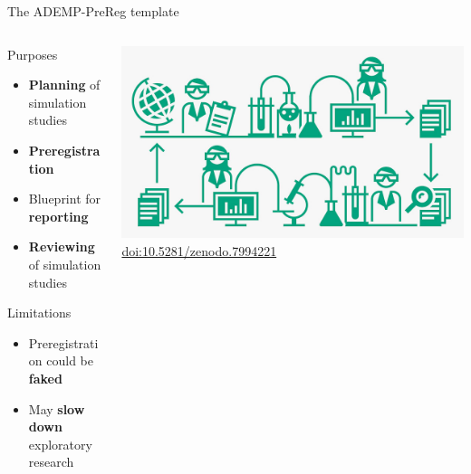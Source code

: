 \documentclass[english, 12pt, aspectratio=169]{beamer}
\begin{document}
\begin{frame}{The ADEMP-PreReg template}
  \begin{columns}
    \begin{column}{0.6\textwidth}

  \begin{block}{Purposes}
    \begin{itemize}
      \pause
      \item \alert{\textbf{Planning}} of simulation studies
      \pause
      \item \alert{\textbf{Preregistration}}
      \pause
      \item Blueprint for \alert{\textbf{reporting}}
      \pause
      \item \alert{\textbf{Reviewing}} of simulation studies
    \end{itemize}
  \end{block}

  \begin{block}{Limitations}
    \begin{itemize}
    \pause
      \item Preregistration could be \alert{\textbf{faked}}
    \pause
      \item May \alert{\textbf{slow down}} exploratory research
    \end{itemize}

  \end{block}
  \end{column}
  \begin{column}{0.4\textwidth}
\centering
    \includegraphics[width=\textwidth]{pics/CRScycle.JPG} \\
    {\tiny \color{gray} \href{https://zenodo.org/doi/10.5281/zenodo.7994221}{doi:10.5281/zenodo.7994221}}


  \end{column}
\end{columns}
\end{frame}
\end{document}
